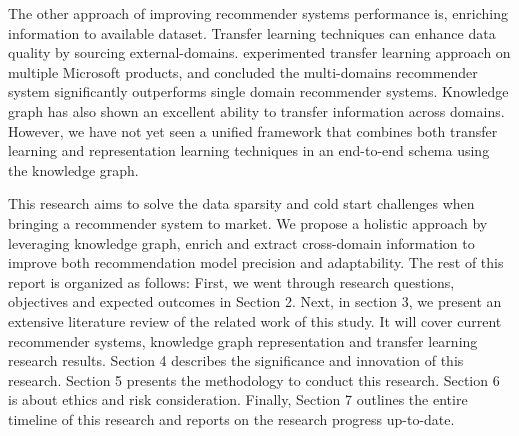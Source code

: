 The other approach of improving recommender systems performance is, enriching information to available dataset. Transfer learning \citep{Pan2010} techniques can enhance data quality by sourcing external-domains. \citet{Elkahky2015} experimented transfer learning approach on multiple Microsoft products, and concluded the multi-domains recommender system significantly outperforms single domain recommender systems. Knowledge graph has also shown an excellent ability to transfer information across domains. However, we have not yet seen a unified framework that combines both transfer learning and representation learning techniques in an end-to-end schema using the knowledge graph.

This research aims to solve the data sparsity and cold start challenges when bringing a recommender system to market. We propose a holistic approach by leveraging knowledge graph, enrich and extract cross-domain information to improve both recommendation model precision and adaptability. The rest of this report is organized as follows: 
First, we went through research questions, objectives and expected outcomes in Section 2. Next, in section 3, we present an extensive literature review of the related work of this study. It will cover current recommender systems, knowledge graph representation and transfer learning research results. Section 4 describes the significance and innovation of this research. Section 5 presents the methodology to conduct this research. Section 6 is about ethics and risk consideration. Finally, Section 7 outlines the entire timeline of this research and reports on the research progress up-to-date.